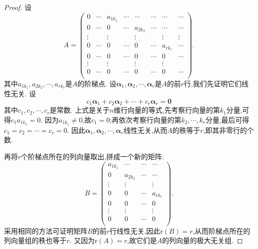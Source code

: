 \documentclass[lang=cn,newtx,10pt,scheme=chinese]{elegantbook}
\begin{document}
\begin{proof}
设
\[
    A=\left( \begin{matrix}
        0&		\cdots&		a_{1k_1}&		\cdots&		\cdots&		\cdots&		\cdots&		\cdots\\
        0&		\cdots&		0&		\cdots&		a_{2k_2}&		\cdots&		\cdots&		\cdots\\
        \vdots&		&		\vdots&		&		\vdots&		&		\vdots&		\vdots\\
        0&		\cdots&		0&		\cdots&		0&		\cdots&		a_{rk_r}&		\cdots\\
        0&		\cdots&		0&		\cdots&		0&		\cdots&		0&		\cdots\\
        \vdots&		&		\vdots&		&		\vdots&		&		\vdots&		\\
        0&		\cdots&		0&		\cdots&		0&		\cdots&		0&		\cdots\\
    \end{matrix} \right) .
\]
其中\(a_{1k_1},a_{2k_2},\cdots,a_{rk_r}\)是\(A\)的阶梯点. 设\(\boldsymbol{\alpha}_1,\boldsymbol{\alpha}_2,\cdots,\boldsymbol{\alpha}_r\)是\(A\)的前\(r\)行,我们先证明它们线性无关. 设
\[
c_1\boldsymbol{\alpha}_1 + c_2\boldsymbol{\alpha}_2+\cdots + c_r\boldsymbol{\alpha}_r=\boldsymbol{0}
\]
其中\(c_1,c_2,\cdots,c_r\)是常数. 上式是关于\(n\)维行向量的等式,先考察行向量的第\(k_1\)分量,可得\(c_1a_{1k_1}=0\). 因为\(a_{1k_1}\neq0\),故\(c_1 = 0\);再依次考察行向量的第\(k_2,\cdots,k_r\)分量,最后可得\(c_1 = c_2=\cdots = c_r = 0\). 因此\(\boldsymbol{\alpha}_1,\boldsymbol{\alpha}_2,\cdots,\boldsymbol{\alpha}_r\)线性无关,从而\(A\)的秩等于\(r\),即其非零行的个数.

再将\(r\)个阶梯点所在的列向量取出,拼成一个新的矩阵:
\[
    B=\left( \begin{matrix}
        a_{1k_1}&		\cdots&		\cdots&		\cdots\\
        0&		a_{2k_2}&		\cdots&		\cdots\\
        \vdots&		\vdots&		&		\vdots\\
        0&		0&		\cdots&		a_{rk_r}\\
        0&		0&		\cdots&		0\\
        \vdots&		\vdots&		&		\vdots\\
        0&		0&		\cdots&		0\\
    \end{matrix} \right) .
\]
采用相同的方法可证明矩阵\(B\)的前\(r\)行线性无关,因此\(\text{r}(B)=r\),从而阶梯点所在的列向量组的秩也等于\(r\). 又因为\(\text{r}(A)=r\),故它们是\(A\)的列向量的极大无关组.
\end{proof}
\end{document}
